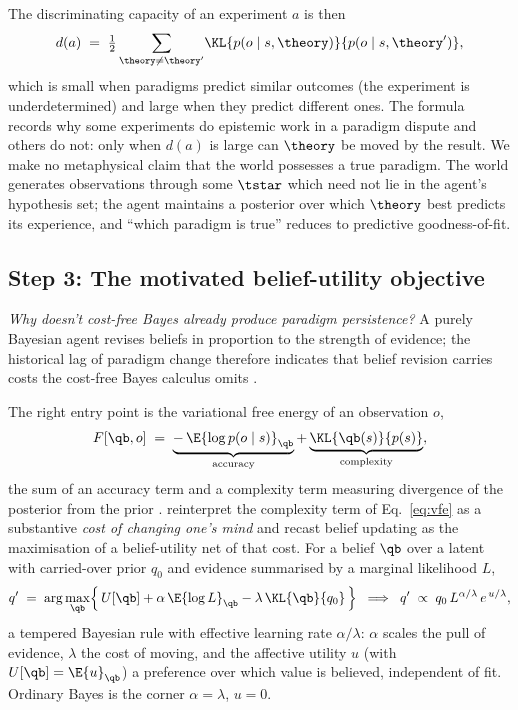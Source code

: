 The discriminating capacity of an experiment $a$ is then
\begin{equation}
d(a) \;=\; \tfrac{1}{2}\sum_{\theory \neq \theory'}\!
   \KL{p(o \mid s, \theory)}{p(o \mid s, \theory')},
\label{eq:discrim}
\end{equation}
which is small when paradigms predict similar outcomes (the
experiment is underdetermined) and large when they predict different
ones. The formula records why some experiments do epistemic work in
a paradigm dispute and others do not: only when $d(a)$ is large can
$\theory$ be moved by the result. We make no metaphysical claim that
the world possesses a true paradigm. The world generates observations
through some $\tstar$ which need not lie in the agent's hypothesis
set; the agent maintains a posterior over which $\theory$ best
predicts its experience, and ``which paradigm is true'' reduces to
predictive goodness-of-fit.

\subsection{Step 3: The motivated belief-utility objective}
\label{ssec:motivated}

\noindent\textit{Why doesn't cost-free Bayes already produce paradigm
persistence?} A purely Bayesian agent revises beliefs in proportion
to the strength of evidence; the historical lag of paradigm change
therefore indicates that belief revision carries costs the cost-free
Bayes calculus omits \citep{kunda1990MotivatedReasoning,
hylandAlbarracin2025MindChange}.%

The right entry point is the variational free energy of an
observation $o$,
\begin{equation}
F[\qb, o] \;=\;
\underbrace{-\,\E{\log p(o \mid s)}_{\qb}}_{\text{accuracy}}
+\underbrace{\KL{\qb(s)}{p(s)}}_{\text{complexity}},
\label{eq:vfe}
\end{equation}
the sum of an accuracy term and a complexity term measuring
divergence of the posterior from the prior
\citep{friston2015ActiveInferenceEpistemic,mathys2014HGF}.
\citet{hylandAlbarracin2025MindChange} reinterpret the complexity
term of Eq.~\eqref{eq:vfe} as a substantive \emph{cost of changing
one's mind} and recast belief updating as the maximisation of a
belief-utility net of that cost. For a belief $\qb$ over a latent
with carried-over prior $q_0$ and evidence summarised by a marginal
likelihood $L$,
\begin{equation}
q' \;=\;
\arg\max_{\qb}\Bigl\{\,
   U[\qb] + \alpha\,\E{\log L}_{\qb} - \lambda\,\KL{\qb}{q_0}\,
\Bigr\}
\;\;\Longrightarrow\;\;
q' \;\propto\; q_0\, L^{\alpha/\lambda}\, e^{\,u/\lambda},
\label{eq:motiv}
\end{equation}
a tempered Bayesian rule with effective learning rate $\alpha/\lambda$:
$\alpha$ scales the pull of evidence, $\lambda$ the cost of moving,
and the affective utility $u$ (with $U[\qb] = \E{u}_{\qb}$) a
preference over which value is believed, independent of fit. Ordinary
Bayes is the corner $\alpha = \lambda$, $u = 0$.

